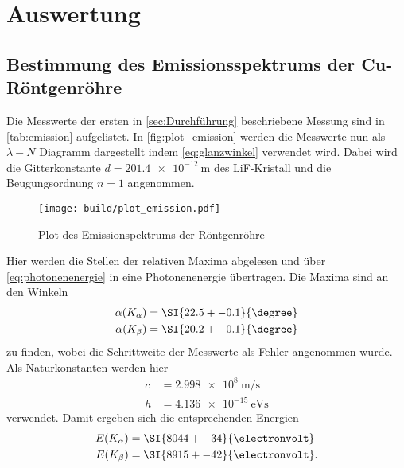 \section{Auswertung}
\label{sec:Auswertung}



\subsection{Bestimmung des Emissionsspektrums der Cu-Röntgenröhre}
\label{ss:Emission}

Die Messwerte der ersten in \autoref{sec:Durchführung} beschriebene Messung sind in \autoref{tab:emission} aufgelistet.
In \autoref{fig:plot_emission} werden die Messwerte nun als $\lambda-N$ Diagramm dargestellt indem \autoref{eq:glanzwinkel} verwendet wird.
Dabei wird die Gitterkonstante $d=\SI{201.4e-12}{\metre}$ des LiF-Kristall und die Beugungsordnung $n=1$ angenommen.

\begin{figure}
    \centering
    \texttt{[image: build/plot\_emission.pdf]}
    \caption{Plot des Emissionspektrums der Röntgenröhre}
    \label{fig:plot_emission}
\end{figure}

Hier werden die Stellen der relativen Maxima abgelesen und über \autoref{eq:photonenenergie} in eine Photonenenergie übertragen.
Die Maxima sind an den Winkeln
\begin{align*}
    \alpha(K_\alpha) &= \SI{22.5+-0.1}{\degree} \\
    \alpha(K_\beta) &= \SI{20.2+-0.1}{\degree}
\end{align*}
zu finden, wobei die Schrittweite der Messwerte als Fehler angenommen wurde. 
Als Naturkonstanten werden hier
\begin{align*}
    c &= \SI{2.998e8}{\metre\per\second} \\
    h &= \SI{4.136e-15}{\electronvolt\second}
\end{align*}
verwendet. \cite{physics_constants}
Damit ergeben sich die entsprechenden Energien 
\begin{align*}
    E(K_\alpha) &= \SI{8044+-34}{\electronvolt} \\
    E(K_\beta) &= \SI{8915+-42}{\electronvolt} .
\end{align*}

